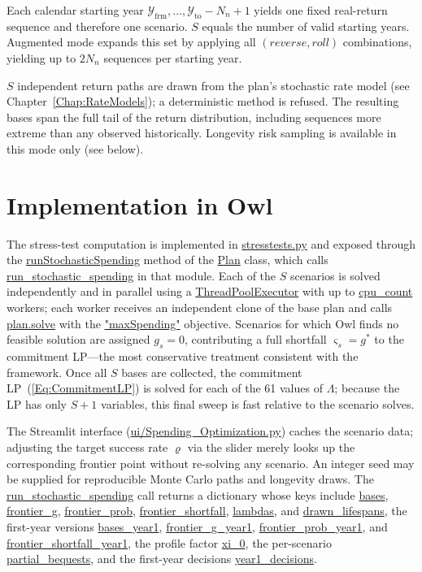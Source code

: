 \documentclass[fleqn,12pt]{report}
\newcommand{\code}[1]{\url{#1}}
\begin{document}
\begin{description}[leftmargin=4em,style=multiline]
\item[Historical]
    Each calendar starting year
    $\mathcal{Y}_{\mathrm{frm}}, \ldots, \mathcal{Y}_{\mathrm{to}} - N_n + 1$
    yields one fixed real-return sequence and therefore one scenario.
    $S$ equals the number of valid starting years.
    Augmented mode expands this set by applying all $(reverse, roll)$
    combinations, yielding up to $2 N_n$ sequences per starting year.
\item[Monte Carlo]
    $S$ independent return paths are drawn from the plan's stochastic rate model
    (see Chapter~\ref{Chap:RateModels}); a deterministic method is refused.
    The resulting bases span the full tail of the return distribution,
    including sequences more extreme than any observed historically.
    Longevity risk sampling is available in this mode only (see below).
\end{description}

\section{Implementation in Owl}

The stress-test computation is implemented in \code{stresstests.py} and
exposed through the \code{runStochasticSpending} method of the \code{Plan}
class, which calls \code{run_stochastic_spending} in that module.
Each of the $S$ scenarios is solved independently and in parallel using a
\code{ThreadPoolExecutor} with up to \code{cpu_count} workers; each worker
receives an independent clone of the base plan and calls \code{plan.solve}
with the \code{"maxSpending"} objective.
Scenarios for which Owl finds no feasible solution are assigned $g_s = 0$,
contributing a full shortfall $\varsigma_s = g^*$ to the commitment LP---the
most conservative treatment consistent with the framework.
Once all $S$ bases are collected, the commitment LP~(\ref{Eq:CommitmentLP})
is solved for each of the 61 values of $\Lambda$; because the LP has only
$S + 1$ variables, this final sweep is fast relative to the scenario
solves.

The Streamlit interface (\code{ui/Spending_Optimization.py}) caches the
scenario data; adjusting the target success rate $\varrho$ via the slider
merely looks up the corresponding frontier point without re-solving any
scenario.
An integer seed may be supplied for reproducible Monte Carlo paths and
longevity draws.
The \code{run_stochastic_spending} call returns a dictionary whose keys include
\code{bases}, \code{frontier_g}, \code{frontier_prob},
\code{frontier_shortfall}, \code{lambdas}, and \code{drawn_lifespans},
the first-year versions \code{bases_year1}, \code{frontier_g_year1},
\code{frontier_prob_year1}, and \code{frontier_shortfall_year1},
the profile factor \code{xi_0}, the per-scenario \code{partial_bequests},
and the first-year decisions \code{year1_decisions}.
\end{document}
